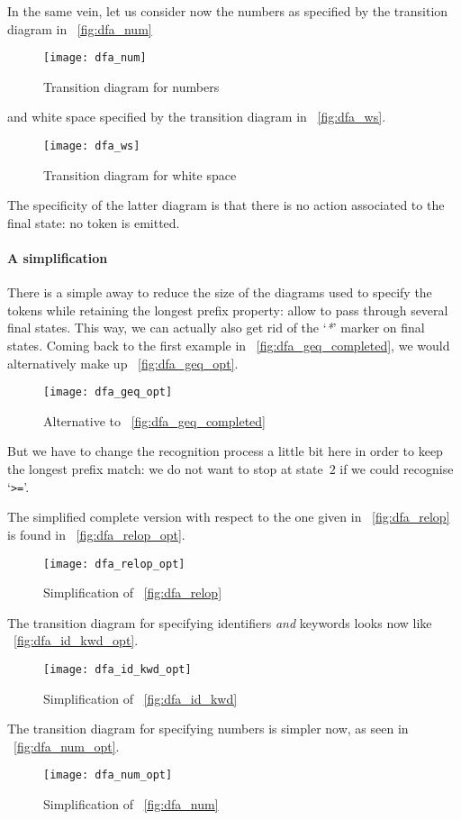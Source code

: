 In the same vein, let us consider now the numbers as specified by the
transition diagram in \fig~\vref{fig:dfa_num}
\begin{figure}
\centering
\texttt{[image: dfa\_num]}
\caption{Transition diagram for numbers\label{fig:dfa_num}}
\end{figure}
and white space specified by the transition diagram in
\fig~\vref{fig:dfa_ws}.
\begin{figure}
\centering
\texttt{[image: dfa\_ws]}
\caption{Transition diagram for white space\label{fig:dfa_ws}}
\end{figure}
The specificity of the latter diagram is that there is no action
associated to the final state: no token is emitted.

\paragraph{A simplification}

There is a simple away to reduce the size of the diagrams used to
specify the tokens while retaining the longest prefix property: allow
to pass through several final states. This way, we can actually also
get rid of the `\emph{\textsc{*}}' marker on final states. Coming back
to the first example in \fig~\vref{fig:dfa_geq_completed}, we would
alternatively make up \fig~\vref{fig:dfa_geq_opt}.
\begin{figure}
\centering
\texttt{[image: dfa\_geq\_opt]}
\caption{Alternative to \fig~\vref{fig:dfa_geq_completed}
\label{fig:dfa_geq_opt}}
\end{figure}
But we have to change the recognition process a little bit here in
order to keep the longest prefix match: we do not want to stop at
state~\(2\) if we could recognise `\texttt{>=}'.

The simplified complete version with respect to the one given in
\fig~\vref{fig:dfa_relop} is found in \fig~\vref{fig:dfa_relop_opt}.
\begin{figure}
\centering
\texttt{[image: dfa\_relop\_opt]}
\caption{Simplification of \fig~\vref{fig:dfa_relop}
\label{fig:dfa_relop_opt}}
\end{figure}
The transition diagram for specifying identifiers \emph{and} keywords
looks now like \fig~\vref{fig:dfa_id_kwd_opt}.
\begin{figure}
\centering
\texttt{[image: dfa\_id\_kwd\_opt]}
\caption{Simplification of \fig~\vref{fig:dfa_id_kwd}
\label{fig:dfa_id_kwd_opt}}
\end{figure}
The transition diagram for specifying numbers is simpler now, as seen
in \fig~\vref{fig:dfa_num_opt}.
\begin{figure}
\centering
\texttt{[image: dfa\_num\_opt]}
\caption{Simplification of \fig~\vref{fig:dfa_num}
\label{fig:dfa_num_opt}}
\end{figure}

